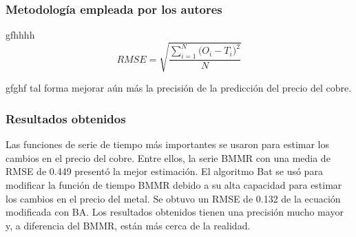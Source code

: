 \subsubsection{Metodología empleada por los autores}
gfhhhh
\begin{equation}  
\label{eq:RMSE}
RMSE = \sqrt{\frac{\sum_{i=1}^{N}{\Big(O_i -T_i\Big)^2}}{N}}
\end{equation}

gfghf tal forma mejorar aún más la precisión de la predicción del precio del cobre.

\subsubsection{Resultados obtenidos}
Las funciones de serie de tiempo más importantes se usaron para estimar los cambios en el precio del cobre. Entre ellos, la serie BMMR con una media de RMSE de 0.449 presentó la mejor estimación. El algoritmo Bat  se usó para modificar la función de tiempo BMMR debido a su alta capacidad para estimar los cambios en el precio del metal. Se obtuvo un RMSE de 0.132 de la ecuación modificada con BA. Los resultados obtenidos tienen una precisión mucho mayor y, a diferencia del BMMR, están más cerca de la realidad.